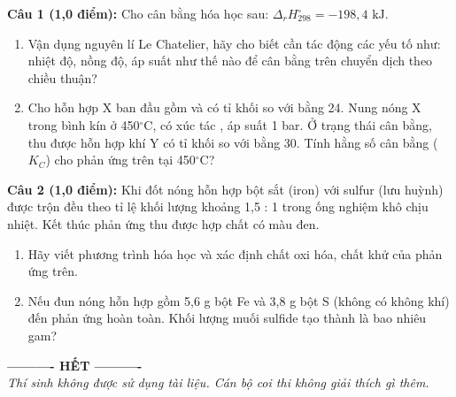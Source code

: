 \documentclass[10.5pt,a4paper]{article}
\begin{document}
\vspace{2pt}
\textbf{Câu 1 (1,0 điểm):} Cho cân bằng hóa học sau:  \quad $\Delta_r H^\circ_{298} = -198,4\text{ kJ}$.
\begin{enumerate}[label=\alph*), itemsep=1.5pt, topsep=1pt, leftmargin=0.8cm]
    \item Vận dụng nguyên lí Le Chatelier, hãy cho biết cần tác động các yếu tố như: nhiệt độ, nồng độ, áp suất như thế nào để cân bằng trên chuyển dịch theo chiều thuận?
    \item Cho hỗn hợp X ban đầu gồm  và  có tỉ khối so với  bằng 24. Nung nóng X trong bình kín ở 450$^\circ$C, có xúc tác , áp suất 1 bar. Ở trạng thái cân bằng, thu được hỗn hợp khí Y có tỉ khối so với  bằng 30. Tính hằng số cân bằng ($K_C$) cho phản ứng trên tại 450$^\circ$C?
\end{enumerate}
\vspace{2.5cm}

\textbf{Câu 2 (1,0 điểm):} Khi đốt nóng hỗn hợp bột sắt (iron) với sulfur (lưu huỳnh) được trộn đều theo tỉ lệ khối lượng khoảng 1,5 : 1 trong ống nghiệm khô chịu nhiệt. Kết thúc phản ứng thu được hợp chất có màu đen.
\begin{enumerate}[label=\alph*), itemsep=1.5pt, topsep=1pt, leftmargin=0.8cm]
    \item Hãy viết phương trình hóa học và xác định chất oxi hóa, chất khử của phản ứng trên.
    \item Nếu đun nóng hỗn hợp gồm 5,6 g bột Fe và 3,8 g bột S (không có không khí) đến phản ứng hoàn toàn. Khối lượng muối sulfide tạo thành là bao nhiêu gam?
\end{enumerate}
\vspace{2.5cm}

\begin{center}
\textbf{---------- HẾT ----------}\\
\textit{\small Thí sinh không được sử dụng tài liệu. Cán bộ coi thi không giải thích gì thêm.}
\end{center}
\end{document}
